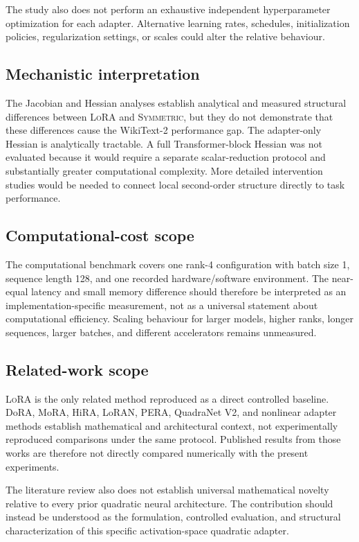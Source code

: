 \documentclass[11pt]{article}
\newcommand{\sym}{\textsc{Symmetric}}\newcommand{\lora}{\textsc{LoRA}}
\begin{document}
The study also does not perform an exhaustive independent hyperparameter optimization for each adapter. Alternative learning rates, schedules, initialization policies, regularization settings, or scales could alter the relative behaviour.

\subsection{Mechanistic interpretation}
The Jacobian and Hessian analyses establish analytical and measured structural differences between \lora{} and \sym{}, but they do not demonstrate that these differences cause the WikiText-2 performance gap. The adapter-only Hessian is analytically tractable. A full Transformer-block Hessian was not evaluated because it would require a separate scalar-reduction protocol and substantially greater computational complexity. More detailed intervention studies would be needed to connect local second-order structure directly to task performance.

\subsection{Computational-cost scope}
The computational benchmark covers one rank-4 configuration with batch size 1, sequence length 128, and one recorded hardware/software environment. The near-equal latency and small memory difference should therefore be interpreted as an implementation-specific measurement, not as a universal statement about computational efficiency. Scaling behaviour for larger models, higher ranks, longer sequences, larger batches, and different accelerators remains unmeasured.

\subsection{Related-work scope}
\lora{} is the only related method reproduced as a direct controlled baseline. DoRA, MoRA, HiRA, LoRAN, PERA, QuadraNet V2, and nonlinear adapter methods establish mathematical and architectural context, not experimentally reproduced comparisons under the same protocol. Published results from those works are therefore not directly compared numerically with the present experiments.

The literature review also does not establish universal mathematical novelty relative to every prior quadratic neural architecture. The contribution should instead be understood as the formulation, controlled evaluation, and structural characterization of this specific activation-space quadratic adapter.
\end{document}
